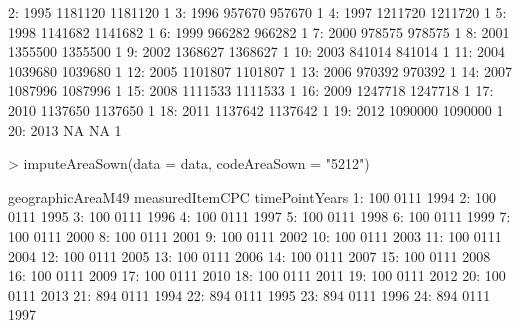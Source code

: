 \documentclass[nojss]{jss}
\begin{document}
\begin{Schunk}
\begin{Soutput}
 2: 1995  1181120       1181120                   1
 3: 1996   957670        957670                   1
 4: 1997  1211720       1211720                   1
 5: 1998  1141682       1141682                   1
 6: 1999   966282        966282                   1
 7: 2000   978575        978575                   1
 8: 2001  1355500       1355500                   1
 9: 2002  1368627       1368627                   1
10: 2003   841014        841014                   1
11: 2004  1039680       1039680                   1
12: 2005  1101807       1101807                   1
13: 2006   970392        970392                   1
14: 2007  1087996       1087996                   1
15: 2008  1111533       1111533                   1
16: 2009  1247718       1247718                   1
17: 2010  1137650       1137650                   1
18: 2011  1137642       1137642                   1
19: 2012  1090000       1090000                   1
20: 2013       NA            NA                   1
\end{Soutput}
\begin{Sinput}
> imputeAreaSown(data = data, codeAreaSown = "5212")
\end{Sinput}
\begin{Soutput}
     geographicAreaM49 measuredItemCPC timePointYears
  1:               100            0111           1994
  2:               100            0111           1995
  3:               100            0111           1996
  4:               100            0111           1997
  5:               100            0111           1998
  6:               100            0111           1999
  7:               100            0111           2000
  8:               100            0111           2001
  9:               100            0111           2002
 10:               100            0111           2003
 11:               100            0111           2004
 12:               100            0111           2005
 13:               100            0111           2006
 14:               100            0111           2007
 15:               100            0111           2008
 16:               100            0111           2009
 17:               100            0111           2010
 18:               100            0111           2011
 19:               100            0111           2012
 20:               100            0111           2013
 21:               894            0111           1994
 22:               894            0111           1995
 23:               894            0111           1996
 24:               894            0111           1997

\end{Soutput}
\end{Schunk}
\end{document}
